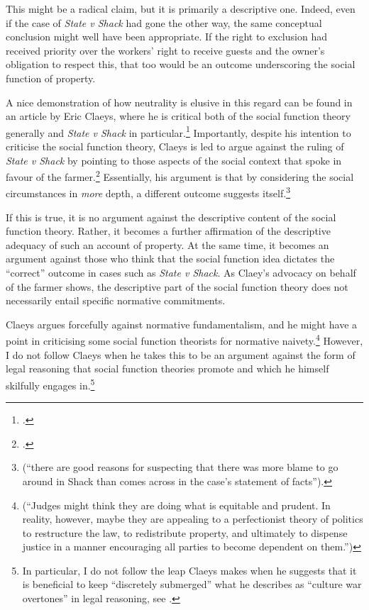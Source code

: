 {This might be a radical claim, but it is primarily a descriptive one. Indeed, even if the case of {\it State v Shack} had gone the other way, the same conceptual conclusion might well have been appropriate. If the right to exclusion had received priority over the workers' right to receive guests and the owner's obligation to respect this, that too would be an outcome underscoring the social function of property. 

A nice demonstration of how neutrality is elusive in this regard can be found in an article by Eric Claeys, where he is critical both of the social function theory generally and {\it State v Shack} in particular.\footcite{claeys09} Importantly, despite his intention to criticise the social function theory, Claeys is led to argue against the ruling of {\it State v Shack} by pointing to those aspects of the social context that spoke in favour of the farmer.\footnote{\cite[941-942]{claeys09}.} Essentially, his argument is that by considering the social circumstances in {\it more} depth, a different outcome suggests itself.\footnote{\cite[941]{claeys09} (``there are good reasons for suspecting that there was more blame to go around in Shack than comes across in the case's statement of facts'').} 

If this is true, it is no argument against the descriptive content of the social function theory. Rather, it becomes a further affirmation of the descriptive adequacy of such an account of property. At the same time, it becomes an argument against those who think that the social function idea dictates the ``correct'' outcome in cases such as {\it State v Shack}. As Claey's advocacy on behalf of the farmer shows, the descriptive part of the social function theory does not necessarily entail specific normative commitments.

Claeys argues forcefully against normative fundamentalism, and he might have a point in criticising some social function theorists for normative naivety.\footnote{\cite[945]{claeys09} (``Judges might think they are doing what is equitable and prudent. In reality, however, maybe they are appealing to a perfectionist theory of politics to restructure the law, to redistribute property, and ultimately to dispense justice in a manner encouraging all parties to become dependent on them.'')} However, I do not follow Claeys when he takes this to be an argument against the form of legal reasoning that social function theories promote and which he himself skilfully engages in.\footnote{In particular, I do not follow the leap Claeys makes when he suggests that it is beneficial to keep ``discretely submerged'' what he describes as ``culture war overtones'' in legal reasoning, see \cite[947]{claeys09}.}

}
